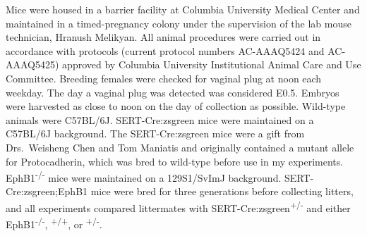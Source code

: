 Mice were housed in a barrier facility at Columbia University Medical Center and maintained in a timed-pregnancy colony under the supervision of the lab mouse technician, Hranush Melikyan.
All animal procedures were carried out in accordance with protocols (current protocol numbers AC-AAAQ5424 and AC-AAAQ5425) approved by Columbia University Institutional Animal Care and Use Committee.
Breeding females were checked for vaginal plug at noon each weekday.
The day a vaginal plug was detected was considered E0.5.
Embryos were harvested as close to noon on the day of collection as possible.
Wild-type animals were C57BL/6J.
SERT-Cre:zsgreen mice were maintained on a C57BL/6J background.
The SERT-Cre:zsgreen mice were a gift from Drs.~Weisheng Chen and Tom Maniatis and originally contained a mutant allele for Protocadherin, which was bred to wild-type before use in my experiments.
EphB1\textsuperscript{-/-} mice were maintained on a 129S1/SvImJ background.
SERT-Cre:zsgreen;EphB1 mice were bred for three generations before collecting litters, and all experiments compared littermates with SERT-Cre:zsgreen\textsuperscript{+/-} and either EphB1\textsuperscript{-/-}, \textsuperscript{+/+}, or \textsuperscript{+/-}.
